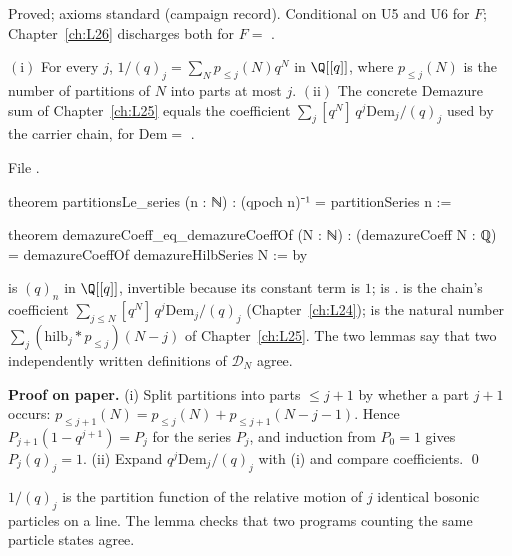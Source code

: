 \begin{status}
Proved; axioms standard (campaign record). Conditional on U5 and U6 for $F$; Chapter~\ref{ch:L26} discharges both for $F=$ .
\end{status}

\begin{lemma}\label{l27:lem:A2book}
$\mathrm{(i)}$ For every $j$, $1/(q)_j=\sum_Np_{\le j}(N)q^N$ in $\Q[[q]]$, where $p_{\le j}(N)$ is the number of partitions of $N$ into parts at most
$j$. $\mathrm{(ii)}$ The concrete Demazure sum of Chapter~\ref{ch:L25} equals the coefficient $\sum_j[q^N]\,q^j\mathrm{Dem}_j/(q)_j$ used by the
carrier chain, for $\mathrm{Dem}=$ .
\end{lemma}
\noindent File .
\begin{leancode}
theorem partitionsLe_series (n : ℕ) : (qpoch n)⁻¹ = partitionSeries n :=
\end{leancode}
\begin{leancode}
theorem demazureCoeff_eq_demazureCoeffOf (N : ℕ) :
    (demazureCoeff N : ℚ) = demazureCoeffOf demazureHilbSeries N := by
\end{leancode}

\begin{dictionary}
 is $(q)_n$ in $\Q[[q]]$, invertible because its constant term is $1$;  is
.  is the chain's coefficient
$\sum_{j\le N}[q^N]\,q^j\mathrm{Dem}_j/(q)_j$ (Chapter~\ref{ch:L24});  is the natural number
$\sum_j(\mathrm{hilb}_j\ast p_{\le j})(N-j)$ of Chapter~\ref{ch:L25}. The two lemmas say that two independently written definitions of
$\mathcal D_N$ agree.
\end{dictionary}

\textbf{Proof on paper.} (i) Split partitions into parts $\le j+1$ by whether a part $j+1$ occurs:
$p_{\le j+1}(N)=p_{\le j}(N)+p_{\le j+1}(N-j-1)$. Hence $P_{j+1}(1-q^{j+1})=P_j$ for the series $P_j$, and induction from $P_0=1$ gives
$P_j(q)_j=1$. (ii) Expand $q^j\mathrm{Dem}_j/(q)_j$ with (i) and compare coefficients. \qed

\begin{physics}
$1/(q)_j$ is the partition function of the relative motion of $j$ identical bosonic particles on a line. The lemma checks that two
programs counting the same particle states agree.
\end{physics}

